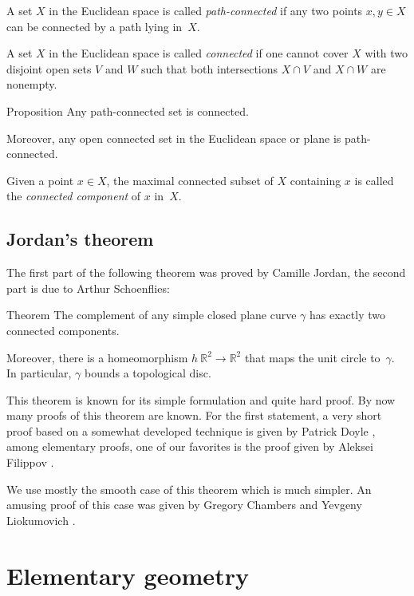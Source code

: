 A set $X$ in the Euclidean space is called \emph{path-connected} if any two points $x,y\in X$ can be connected by a path lying in~$X$.

A set $X$ in the Euclidean space is called \emph{connected} if one cannot cover $X$ with two disjoint open sets $V$ and $W$ such that both intersections $X\cap V$ and $X\cap W$ are nonempty.

\begin{thm}{Proposition}
Any path-connected set is connected.

Moreover, any open connected set in the Euclidean space or plane is path-connected.
\end{thm}

Given a point $x\in X$, the maximal connected subset of $X$ containing $x$ is called the {}\emph{connected component} of $x$ in~$X$.

\subsection*{Jordan's theorem}

The first part of the following theorem was proved by Camille Jordan, the second part is due to Arthur Schoenflies:

\begin{thm}{Theorem}\label{thm:jordan}
The complement of any simple closed plane curve $\gamma$ has exactly two connected components. 

Moreover, there is a homeomorphism $h\:\mathbb{R}^2\to \mathbb{R}^2$ that maps the unit circle to~$\gamma$.
In particular, $\gamma$ bounds a topological disc.
\end{thm}

This theorem is known for its simple formulation and quite hard proof.
By now many proofs of this theorem are known.
For the first statement, a very short proof based on a somewhat developed technique is given by Patrick Doyle \cite{doyle},
among elementary proofs, one of our favorites is the proof given by Aleksei Filippov \cite{filippov}.

We use mostly the smooth case of this theorem which is much simpler.
An amusing proof of this case was given by Gregory Chambers and Yevgeny Liokumovich \cite{chambers-liokumovich}.

\section{Elementary geometry}

